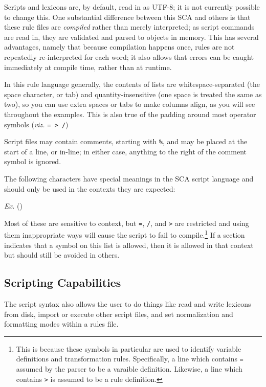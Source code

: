 \documentclass[10pt,letterpaper]{article}
\newcounter{excounter}
\newenvironment{vex}[1]{
	\refstepcounter{excounter}
	\noindent\emph{Ex.} (\arabic{excounter}\label{#1})
	\verbatim
}{\endverbatim}
\begin{document}
Scripts and lexicons are, by default, read in as UTF-8; it is not currently possible to change this. One substantial difference between this SCA and others is that these rule files are \emph{compiled} rather than merely interpreted; as script commands are read in, they are validated and parsed to objects in memory. This has several advantages, namely that because compilation happens once, rules are not repeatedly re-interpreted for each word; it also allows that errors can be caught immediately at compile time, rather than at runtime.

In this rule language generally, the contents of lists are whitespace-separated (the space character, or tab) and quantity-insensitive (one space is treated the same as two), so you can use extra spaces or tabs to make columns align, as you will see throughout the examples. This is also true of the padding around most operator symbols (\emph{viz.} \texttt{= > /})


Script files may contain comments, starting with \texttt{\%}, and may be placed at the start of a line, or in-line; in either case, anything to the right of the comment symbol is ignored.

The following characters have special meanings in the SCA script language and should only be used in the contexts they are expected:

\begin{vex}{ex:reserved}
\end{vex}
\noindent
Most of these are sensitive to context, but \texttt{=}, \texttt{/}, and \texttt{>} are restricted and using them inappropriate ways will cause the script to  fail to compile.\footnote{This is because these symbols in particular are used to identify variable definitions and transformation rules. Specifically, a line which contains \texttt{=} assumed by the parser to be a varaible definition. Likewise, a line which contains \texttt{>} is assumed to be a rule definition.} If a section indicates that a symbol on this list is allowed, then it is allowed in that context but should still be avoided in others.


\subsection{Scripting Capabilities}
\label{sub:scripting_capabilities}
The script syntax also allows the user to do things like read and write lexicons from disk, import or execute other script files, and set normalization and formatting modes within a rules file.
\end{document}
